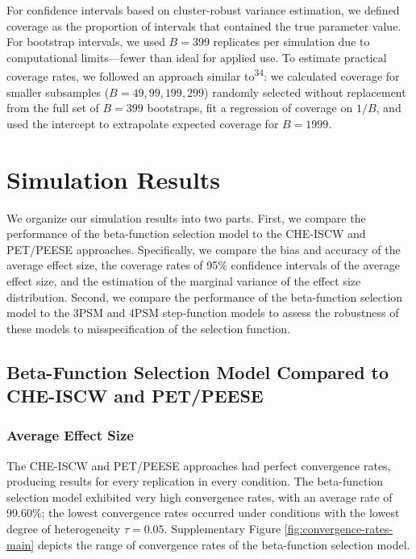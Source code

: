 \documentclass[
  american,
  man, donotrepeattitle,floatsintext]{apa7}
\begin{document}
For confidence intervals based on cluster-robust variance estimation, we defined coverage as the proportion of intervals that contained the true parameter value. For bootstrap intervals, we used \(B = 399\) replicates per simulation due to computational limits---fewer than ideal for applied use. To estimate practical coverage rates, we followed an approach similar to\textsuperscript{34}: we calculated coverage for smaller subsamples (\(B = 49, 99, 199, 299\)) randomly selected without replacement from the full set of \(B = 399\) bootstraps, fit a regression of coverage on \(1/B\), and used the intercept to extrapolate expected coverage for \(B = 1999\).

\section{Simulation Results}\label{simulation-results}

We organize our simulation results into two parts. First, we compare the performance of the beta-function selection model to the CHE-ISCW and PET/PEESE approaches. Specifically, we compare the bias and accuracy of the average effect size, the coverage rates of 95\% confidence intervals of the average effect size, and the estimation of the marginal variance of the effect size distribution. Second, we compare the performance of the beta-function selection model to the 3PSM and 4PSM step-function models to assess the robustness of these models to misspecification of the selection function.

\subsection{Beta-Function Selection Model Compared to CHE-ISCW and PET/PEESE}\label{beta-function-selection-model-compared-to-che-iscw-and-petpeese}

\subsubsection{Average Effect Size}\label{average-effect-size}

The CHE-ISCW and PET/PEESE approaches had perfect convergence rates, producing results for every replication in every condition. The beta-function selection model exhibited very high convergence rates, with an average rate of 99.60\%; the lowest convergence rates occurred under conditions with the lowest degree of heterogeneity \(\tau = 0.05\). Supplementary Figure \ref{fig:convergence-rates-main} depicts the range of convergence rates of the beta-function selection model.
\end{document}
